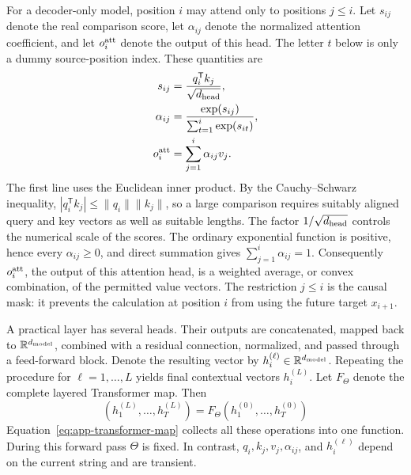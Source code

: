 \documentclass[
  aps,
  reprint,
  superscriptaddress,
  floatfix,
  nofootinbib,
  longbibliography
]{revtex4-2}
\newcommand{\R}{\mathbb{R}}
\newcommand{\T}{^{\mathsf{T}}}
\newcommand{\norm}[1]{\lVert #1 \rVert}
\begin{document}
For a decoder-only model, position $i$ may attend only to positions
$j\leq i$.  Let $s_{ij}$ denote the real comparison score, let
$\alpha_{ij}$ denote the normalized attention coefficient, and let
$o_i^{\rm att}$ denote the output of this head.  The letter $t$ below is only a
dummy source-position index.  These quantities are
\begin{equation}
\label{eq:app-attention-expanded}
\begin{aligned}
s_{ij}&=\frac{q_i\T k_j}{\sqrt{d_{\rm head}}},\\
\alpha_{ij}
&=\frac{\exp(s_{ij})}
{\sum_{t=1}^{i}\exp(s_{it})},\\
o_i^{\rm att}&=\sum_{j=1}^{i}\alpha_{ij}v_j.
\end{aligned}
\end{equation}
The first line uses the Euclidean inner product.  By the Cauchy--Schwarz
inequality, $|q_i\T k_j|\leq\norm{q_i}\norm{k_j}$, so a large comparison
requires suitably aligned query and key vectors as well as suitable lengths.
The factor $1/\sqrt{d_{\rm head}}$ controls the numerical scale of the scores.
The ordinary exponential function is positive, hence every
$\alpha_{ij}\geq0$, and direct summation gives
$\sum_{j=1}^{i}\alpha_{ij}=1$.  Consequently $o_i^{\rm att}$, the output of
this attention head, is a weighted average, or convex combination, of the
permitted value vectors.  The restriction $j\leq i$
is the causal mask: it prevents the calculation at position $i$ from using the
future target $x_{i+1}$.

A practical layer has several heads.  Their outputs are concatenated, mapped
back to $\R^{d_{\rm model}}$, combined with a residual connection, normalized,
and passed through a feed-forward block.  Denote the resulting vector by
$h_i^{(\ell)}\in\R^{d_{\rm model}}$.  Repeating the procedure for
$\ell=1,\ldots,L$ yields final contextual vectors $h_i^{(L)}$.  Let $F_\Theta$
denote the complete layered Transformer map.  Then
\begin{equation}
\label{eq:app-transformer-map}
(h_1^{(L)},\ldots,h_T^{(L)})
=F_\Theta(h_1^{(0)},\ldots,h_T^{(0)})
\end{equation}
Equation~\eqref{eq:app-transformer-map} collects all these operations into one
function.  During this forward pass
$\Theta$ is fixed.  In contrast, $q_i,k_j,v_j,\alpha_{ij}$, and
$h_i^{(\ell)}$ depend on the current string and are transient.
\end{document}
